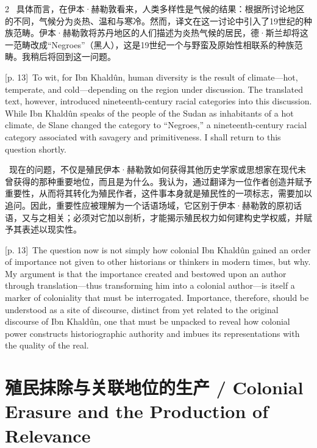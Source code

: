 \documentclass[10pt,a4paper]{article}
\begin{document}
\begin{paracol}{2}
\switchcolumn*
{\scriptsize\color{gray} [p. 13]}\ 具体而言，在伊本·赫勒敦看来，人类多样性是气候的结果：根据所讨论地区的不同，气候分为炎热、温和与寒冷。然而，译文在这一讨论中引入了19世纪的种族范畴。伊本·赫勒敦将苏丹地区的人们描述为炎热气候的居民，德·斯兰却将这一范畴改成“Negroes”（黑人），这是19世纪一个与野蛮及原始性相联系的种族范畴。我稍后将回到这一问题。\par
\switchcolumn
{\scriptsize\color{gray} [p. 13]}\ To wit, for Ibn Khaldûn, human diversity is the result of climate—hot, temperate, and cold—depending on the region under discussion. The translated text, however, introduced nineteenth-century racial categories into this discussion. While Ibn Khaldûn speaks of the people of the Sudan as inhabitants of a hot climate, de Slane changed the category to “Negroes,” a nineteenth-century racial category associated with savagery and primitiveness. I shall return to this question shortly.\par
\switchcolumn*
{\scriptsize\color{gray} [p. 13]}\ 现在的问题，不仅是殖民伊本·赫勒敦如何获得其他历史学家或思想家在现代未曾获得的那种重要地位，而且是为什么。我认为，通过翻译为一位作者创造并赋予重要性，从而将其转化为殖民作者，这件事本身就是殖民性的一项标志，需要加以追问。因此，重要性应被理解为一个话语场域，它区别于伊本·赫勒敦的原初话语，又与之相关；必须对它加以剖析，才能揭示殖民权力如何建构史学权威，并赋予其表述以现实性。\par
\switchcolumn
{\scriptsize\color{gray} [p. 13]}\ The question now is not simply how colonial Ibn Khaldûn gained an order of importance not given to other historians or thinkers in modern times, but why. My argument is that the importance created and bestowed upon an author through translation—thus transforming him into a colonial author—is itself a marker of coloniality that must be interrogated. Importance, therefore, should be understood as a site of discourse, distinct from yet related to the original discourse of Ibn Khaldûn, one that must be unpacked to reveal how colonial power constructs historiographic authority and imbues its representations with the quality of the real.\par
\switchcolumn*
\end{paracol}
\section*{殖民抹除与关联地位的生产 / Colonial Erasure and the Production of Relevance}
\end{document}
